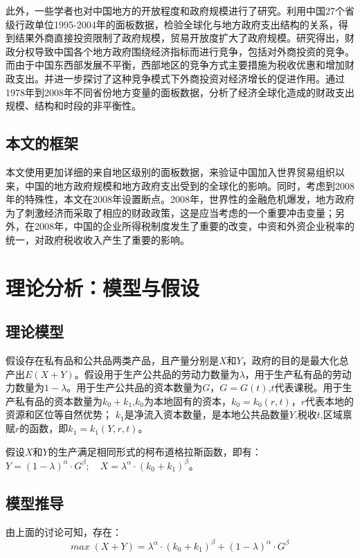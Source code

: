 \documentclass[10pt]{article}
\begin{document}
此外，一些学者也对中国地方的开放程度和政府规模进行了研究。\cite{cai2008}利用中国27个省级行政单位1995-2004年的面板数据，检验全球化与地方政府支出结构的关系，得到结果外商直接投资限制了政府规模，贸易开放度扩大了政府规模。\cite{wang2007}研究得出，财政分权导致中国各个地方政府围绕经济指标而进行竞争，包括对外商投资的竞争。而由于中国东西部发展不平衡，西部地区的竞争方式主要措施为税收优惠和增加财政支出。并进一步探讨了这种竞争模式下外商投资对经济增长的促进作用。\cite{sheng2010}通过1978年到2008年不同省份地方变量的面板数据，分析了经济全球化造成的财政支出规模、结构和时段的非平衡性。
\subsection{本文的框架}
本文使用更加详细的来自地区级别的面板数据，来验证中国加入世界贸易组织以来，中国的地方政府规模和地方政府支出受到的全球化的影响。同时，考虑到2008年的特殊性，本文在2008年设置断点。2008年，世界性的金融危机爆发，地方政府为了刺激经济而采取了相应的财政政策，这是应当考虑的一个重要冲击变量；另外，在2008年，中国的企业所得税制度发生了重要的改变，中资和外资企业税率的统一，对政府税收收入产生了重要的影响。

\section{理论分析：模型与假设}
\subsection{理论模型}
假设存在私有品和公共品两类产品，且产量分别是$X$和$Y$，政府的目的是最大化总产出$E(X+Y)$。假设用于生产公共品的劳动力数量为$\lambda$，用于生产私有品的劳动力数量为$1-\lambda$。用于生产公共品的资本数量为$G$，$G=G(t)$,$t$代表课税。用于生产私有品的资本数量为$k_0+k_1$,$k_0$为本地固有的资本，$k_0 = k_0(r, t)$，$r$代表本地的资源和区位等自然优势； $k_1$是净流入资本数量，是本地公共品数量$Y$,税收$t$,区域禀赋$r$的函数，即$k_1 = k_1(Y, r, t)$。

假设$X$和$Y$的生产满足相同形式的柯布道格拉斯函数，即有：$Y=(1-\lambda)^{\alpha} \cdot G^{\beta}; \quad X=\lambda^{\alpha} \cdot (k_0+k_1)^{\beta}$。

\added[remark={此处应插入对函数的要求和解释}]{}

\subsection{模型推导}
由上面的讨论可知，存在：
\begin{equation}
max \; (X+Y) = \lambda^{\alpha} \cdot (k_0+k_1)^{\beta} + (1-\lambda)^{\alpha} \cdot G^{\beta}	
\end{equation}
\end{document}
